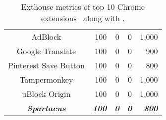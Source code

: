{\begin{table}[t]
{\begin{tabular}{crrrr}
\rowcolor[HTML]{C0C0C0} 
AdBlock                     & 100                                & 0                                                                                        & 0                                                                                              & 1,000                                                                            \\
\rowcolor[HTML]{EFEFEF} 
Google Translate            & 100                                & 0                                                                                        & 0                                                                                              & 900                                                                              \\
\rowcolor[HTML]{C0C0C0} 
Pinterest Save Button       & 100                                & 0                                                                                        & 0                                                                                              & 800                                                                              \\
\rowcolor[HTML]{EFEFEF} 
Tampermonkey                & 100                                & 0                                                                                        & 0                                                                                              & 1,000                                                                            \\
\rowcolor[HTML]{C0C0C0} 
uBlock Origin               & 100                                & 0                                                                                        & 0                                                                                              & 1,000                                                                            \\ \midrule
\textit{\textbf{Spartacus}} & \textit{\textbf{100}}              & \textit{\textbf{0}}                                                                      & \textit{\textbf{0}}                                                                            & \textit{\textbf{800}}                                                            \\ \bottomrule
\end{tabular}
}
\caption{Exthouse metrics of top 10 Chrome extensions~\cite{exthouse} along with \spartacus.}
\label{tab:exthouse}
\end{table}
}


